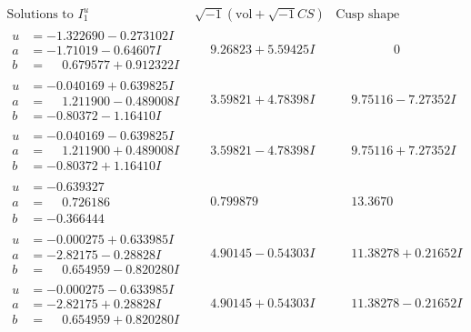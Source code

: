 \documentclass[1p]{elsarticle_modified}
\theoremstyle{definition}
\newcommand{\I}{\sqrt{-1}}
\begin{document}
$$\begin{array}{c|c|c}
\text{Solutions to }I^u_{1}& \I (\text{vol} + \sqrt{-1}CS) & \text{Cusp shape}\\
 \hline 
\begin{aligned}
u &= -1.322690 - 0.273102 I \\
a &= -1.71019 - 0.64607 I \\
b &= \phantom{-}0.679577 + 0.912322 I\end{aligned}
 & \phantom{-}9.26823 + 5.59425 I & \phantom{-0.000000 } 0 \\ \hline\begin{aligned}
u &= -0.040169 + 0.639825 I \\
a &= \phantom{-}1.211900 - 0.489008 I \\
b &= -0.80372 - 1.16410 I\end{aligned}
 & \phantom{-}3.59821 + 4.78398 I & \phantom{-}9.75116 - 7.27352 I \\ \hline\begin{aligned}
u &= -0.040169 - 0.639825 I \\
a &= \phantom{-}1.211900 + 0.489008 I \\
b &= -0.80372 + 1.16410 I\end{aligned}
 & \phantom{-}3.59821 - 4.78398 I & \phantom{-}9.75116 + 7.27352 I \\ \hline\begin{aligned}
u &= -0.639327\phantom{ +0.000000I} \\
a &= \phantom{-}0.726186\phantom{ +0.000000I} \\
b &= -0.366444\phantom{ +0.000000I}\end{aligned}
 & \phantom{-}0.799879\phantom{ +0.000000I} & \phantom{-}13.3670\phantom{ +0.000000I} \\ \hline\begin{aligned}
u &= -0.000275 + 0.633985 I \\
a &= -2.82175 - 0.28828 I \\
b &= \phantom{-}0.654959 - 0.820280 I\end{aligned}
 & \phantom{-}4.90145 - 0.54303 I & \phantom{-}11.38278 + 0.21652 I \\ \hline\begin{aligned}
u &= -0.000275 - 0.633985 I \\
a &= -2.82175 + 0.28828 I \\
b &= \phantom{-}0.654959 + 0.820280 I\end{aligned}
 & \phantom{-}4.90145 + 0.54303 I & \phantom{-}11.38278 - 0.21652 I \\ \hline\begin{aligned}

\end{aligned}
\end{array}$$
\end{document}
